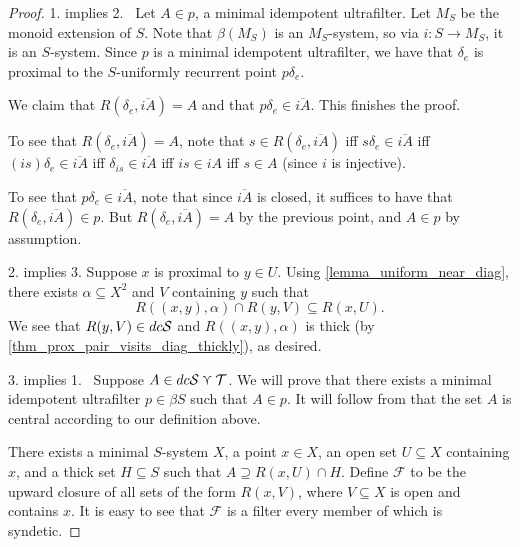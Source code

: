 \begin{proof}
    1. implies 2. \ Let $A \in p$, a minimal idempotent ultrafilter.  Let $M_S$ be the monoid extension of $S$.  Note that $\beta (M_S)$ is an $M_S$-system, so via $i: S \to M_S$, it is an $S$-system.  Since $p$ is a minimal idempotent ultrafilter, we have that $\delta_e$ is proximal to the $S$-uniformly recurrent point $p \delta_e$.
    
    We claim that $R(\delta_e, \overline{iA}) = A$ and that $p \delta_e \in \overline{iA}$.  This finishes the proof.
    
    To see that $R(\delta_e, \overline{iA}) = A$, note that $s \in R(\delta_e, \overline{iA})$ iff $s \delta_e \in \overline{iA}$ iff $(is) \delta_e \in \overline{iA}$ iff $\delta_{is} \in \overline{iA}$ iff $is \in iA$ iff $s \in A$ (since $i$ is injective).

    To see that $p \delta_e \in \overline{iA}$, note that since $\overline{iA}$ is closed, it suffices to have that $R(\delta_e,\overline{iA}) \in p$.  But $R(\delta_e,\overline{iA}) = A$ by the previous point, and $A \in p$ by assumption.

    2. implies 3. Suppose $x$ is proximal to $y \in U$.  Using \cref{lemma_uniform_near_diag}, there exists $\alpha \subseteq X^2$ and $V$ containing $y$ such that
    \[R((x,y),\alpha) \cap R(y,V) \subseteq R(x,U).\]
    We see that $R(y,V) \in dc\mathcal{S}$ and $R((x,y), \alpha)$ is thick (by \cref{thm_prox_pair_visits_diag_thickly}), as desired.

    3. implies 1. \ Suppose $A \in dc\mathcal{S} \curlyvee \mathcal{T}$.  We will prove that there exists a minimal idempotent ultrafilter $p \in \beta S$ such that $A \in p$.  It will follow from \cite[Thm. 19.27]{hindman_strauss_book_2012} that the set $A$ is central according to our definition above.

    There exists a minimal $S$-system $X$, a point $x \in X$, an open set $U \subseteq X$ containing $x$, and a thick set $H \subseteq S$ such that $A \supseteq R(x,U) \cap H$.  Define $\mathscr{F}$ to be the upward closure of all sets of the form $R(x,V)$, where $V \subseteq X$ is open and contains $x$.
    It is easy to see that $\mathscr{F}$ is a filter every member of which is syndetic.
    

\end{proof}
